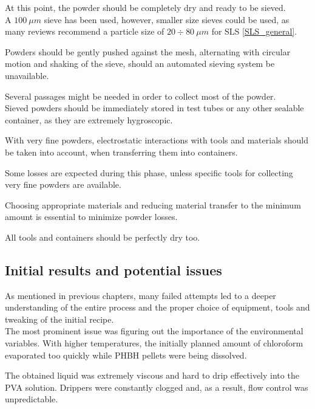 \documentclass{article}
\begin{document}
        At this point, the powder should be completely dry and ready to be sieved. \\ 

        A $100 \ \mu m$ sieve has been used, however, smaller size sieves could be used, as many reviews recommend a particle 
        size of $20 \div 80 \ \mu m$ for SLS \ref{SLS_general}. 
        
        Powders should be gently pushed against the mesh, alternating with circular motion and shaking of the sieve, should 
        an automated sieving system be unavailable. 

        Several passages might be needed in order to collect most of the powder. \\ 

        Sieved powders should be immediately stored in test tubes or any other sealable container, as they are extremely hygroscopic. 

        With very fine powders, electrostatic interactions with tools and materials should be taken into account, when transferring 
        them into containers. 

        Some losses are expected during this phase, unless specific tools for collecting very fine powders are available. 

        Choosing appropriate materials and reducing material transfer to the minimum amount is essential to minimize 
        powder losses. 

        All tools and containers should be perfectly dry too. 



        \subsection{Initial results and potential issues\label{initial_failures}}

        As mentioned in previous chapters, many failed attempts led to a deeper understanding of the entire process 
        and the proper choice of equipment, tools and tweaking of the initial recipe. \\ 

        The most prominent issue was figuring out the importance of the environmental variables. With higher temperatures, the initially planned amount of chloroform evaporated too 
        quickly while PHBH pellets were being dissolved. 

        The obtained liquid was extremely viscous and hard to drip effectively into the PVA solution. Drippers were constantly clogged
        and, as a result, flow control was unpredictable. 
        
\end{document}
